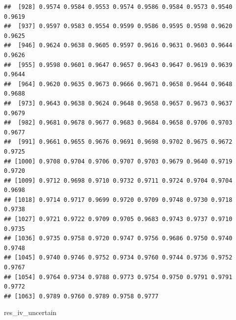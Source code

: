 \documentclass[]{article}
\newenvironment{Shaded}{\begin{snugshade}}{\end{snugshade}}
\newcommand{\NormalTok}[1]{{#1}}
\begin{document}
\begin{verbatim}
##  [928] 0.9574 0.9584 0.9553 0.9574 0.9586 0.9584 0.9573 0.9540 0.9619
##  [937] 0.9597 0.9583 0.9554 0.9599 0.9586 0.9595 0.9598 0.9620 0.9625
##  [946] 0.9624 0.9638 0.9605 0.9597 0.9616 0.9631 0.9603 0.9644 0.9626
##  [955] 0.9598 0.9601 0.9647 0.9657 0.9643 0.9647 0.9619 0.9639 0.9644
##  [964] 0.9620 0.9635 0.9673 0.9666 0.9671 0.9658 0.9644 0.9648 0.9688
##  [973] 0.9643 0.9638 0.9624 0.9648 0.9658 0.9657 0.9673 0.9637 0.9679
##  [982] 0.9681 0.9678 0.9677 0.9683 0.9684 0.9658 0.9706 0.9703 0.9677
##  [991] 0.9661 0.9655 0.9676 0.9691 0.9698 0.9702 0.9675 0.9672 0.9725
## [1000] 0.9708 0.9704 0.9706 0.9707 0.9703 0.9679 0.9640 0.9719 0.9720
## [1009] 0.9712 0.9698 0.9710 0.9732 0.9711 0.9724 0.9704 0.9704 0.9698
## [1018] 0.9714 0.9717 0.9699 0.9720 0.9709 0.9748 0.9730 0.9718 0.9738
## [1027] 0.9721 0.9722 0.9709 0.9705 0.9683 0.9743 0.9737 0.9710 0.9735
## [1036] 0.9735 0.9758 0.9720 0.9747 0.9756 0.9686 0.9750 0.9740 0.9748
## [1045] 0.9740 0.9746 0.9752 0.9734 0.9760 0.9744 0.9736 0.9752 0.9767
## [1054] 0.9764 0.9734 0.9788 0.9773 0.9754 0.9750 0.9791 0.9791 0.9772
## [1063] 0.9789 0.9760 0.9789 0.9758 0.9777
\end{verbatim}

\begin{Shaded}
\begin{Highlighting}[]
\NormalTok{res_iv_uncertain}
\end{Highlighting}
\end{Shaded}
\end{document}
